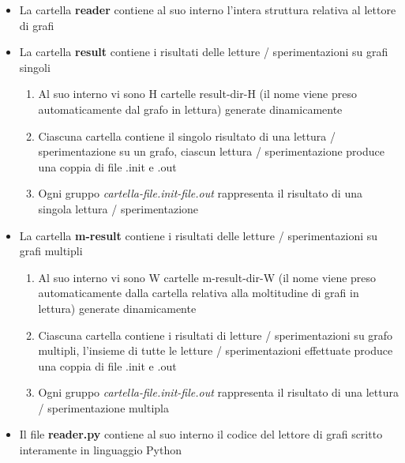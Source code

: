 \begin{itemize}
	\item La cartella \textbf{reader} contiene al suo interno l'intera struttura relativa al lettore di grafi
	\item La cartella \textbf{result} contiene i risultati delle letture / sperimentazioni su grafi singoli
	\begin{enumerate}
		\item Al suo interno vi sono H cartelle result-dir-H (il nome viene preso automaticamente dal grafo in lettura) generate dinamicamente
		\item Ciascuna cartella contiene il singolo risultato di una lettura / sperimentazione su un grafo, ciascun lettura / sperimentazione produce una coppia di file .init e .out
		\item Ogni gruppo \textit{cartella-file.init-file.out} rappresenta il risultato di una singola lettura / sperimentazione 
	\end{enumerate}
	\item La cartella \textbf{m-result} contiene i risultati delle letture / sperimentazioni su grafi multipli
	\begin{enumerate}
		\item Al suo interno vi sono W cartelle m-result-dir-W (il nome viene preso automaticamente dalla cartella relativa alla moltitudine di grafi in lettura) generate dinamicamente
		\item Ciascuna cartella contiene i risultati di letture / sperimentazioni su grafo multipli, l'insieme di tutte le letture / sperimentazioni effettuate produce una coppia di file .init e .out
		\item Ogni gruppo \textit{cartella-file.init-file.out} rappresenta il risultato di una lettura / sperimentazione multipla
	\end{enumerate}
	\item Il file \textbf{reader.py} contiene al suo interno il codice del lettore di grafi scritto interamente in linguaggio Python 
\end{itemize}

\newpage
{}

